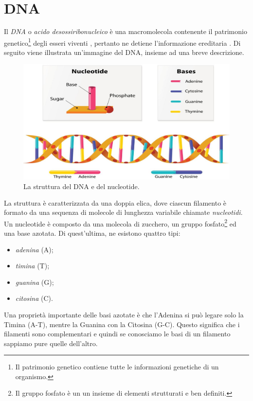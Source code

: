 \section{DNA}
Il \textit{DNA} o \textit{acido desossiribonucleico} è una macromolecola contenente il patrimonio genetico\footnote{Il patrimonio genetico contiene tutte le informazioni genetiche di un organismo.} degli esseri viventi \cite{campbellBiology}, pertanto ne detiene l'informazione ereditaria \cite{BiologySolomon}.
\newline
Di seguito viene illustrata un'immagine del DNA, insieme ad una breve descrizione.
\newline
\begin{figure}[h!]
	\includegraphics[width=\linewidth]{DNAStructure.jpg}
 	\caption{La struttura del DNA e del nucleotide.}
  	\label{fig:DnaAndNucleotideStructure}
\end{figure}
\newline
La struttura è caratterizzata da una doppia elica, dove ciascun filamento è formato da una sequenza di molecole di lunghezza variabile chiamate \textit{nucleotidi}.
\newline
Un nucleotide è composto da una molecola di zucchero, un gruppo fosfato\footnote{Il gruppo fosfato è un un insieme di elementi strutturati e ben definiti.} ed una base azotata. Di quest'ultima, ne esistono quattro tipi:
\begin{itemize}
	\item \textit{adenina} (A);
	\item \textit{timina} (T);
	\item \textit{guanina} (G);
	\item \textit{citosina} (C).
\end{itemize}
Una proprietà importante delle basi azotate è che l'Adenina si può legare solo la Timina (A-T), mentre la Guanina con la Citosina (G-C). Questo significa che i filamenti sono complementari e quindi se conosciamo le basi di un filamento sappiamo pure quelle dell'altro.

